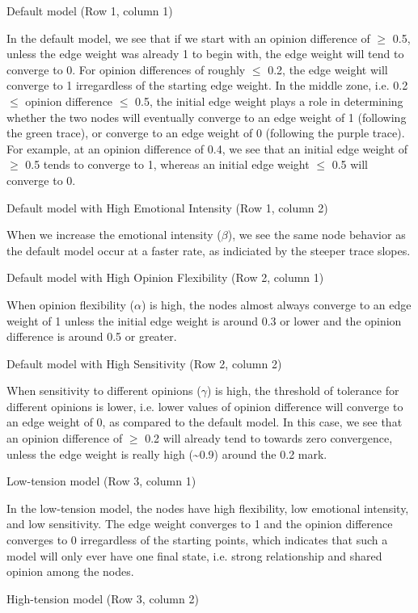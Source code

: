 \documentclass[11pt]{article}
\begin{document}
Default model (Row 1, column 1)

In the default model, we see that if we start with an opinion difference
of \(\geq\) 0.5, unless the edge weight was already 1 to begin with, the
edge weight will tend to converge to 0. For opinion differences of
roughly \(\leq\) 0.2, the edge weight will converge to 1 irregardless of
the starting edge weight. In the middle zone, i.e. 0.2 \(\leq\) opinion
difference \(\leq\) 0.5, the initial edge weight plays a role in
determining whether the two nodes will eventually converge to an edge
weight of 1 (following the green trace), or converge to an edge weight
of 0 (following the purple trace). For example, at an opinion difference
of 0.4, we see that an initial edge weight of \(\geq\) 0.5 tends to
converge to 1, whereas an initial edge weight \(\leq\) 0.5 will converge
to 0.

Default model with High Emotional Intensity (Row 1, column 2)

When we increase the emotional intensity (\(\beta\)), we see the same
node behavior as the default model occur at a faster rate, as indiciated
by the steeper trace slopes.

Default model with High Opinion Flexibility (Row 2, column 1)

When opinion flexibility (\(\alpha\)) is high, the nodes almost always
converge to an edge weight of 1 unless the initial edge weight is around
0.3 or lower and the opinion difference is around 0.5 or greater.

Default model with High Sensitivity (Row 2, column 2)

When sensitivity to different opinions (\(\gamma\)) is high, the
threshold of tolerance for different opinions is lower, i.e. lower
values of opinion difference will converge to an edge weight of 0, as
compared to the default model. In this case, we see that an opinion
difference of \(\geq\) 0.2 will already tend to towards zero
convergence, unless the edge weight is really high
(\textasciitilde{}0.9) around the 0.2 mark.

Low-tension model (Row 3, column 1)

In the low-tension model, the nodes have high flexibility, low emotional
intensity, and low sensitivity. The edge weight converges to 1 and the
opinion difference converges to 0 irregardless of the starting points,
which indicates that such a model will only ever have one final state,
i.e. strong relationship and shared opinion among the nodes.

High-tension model (Row 3, column 2)
\end{document}
